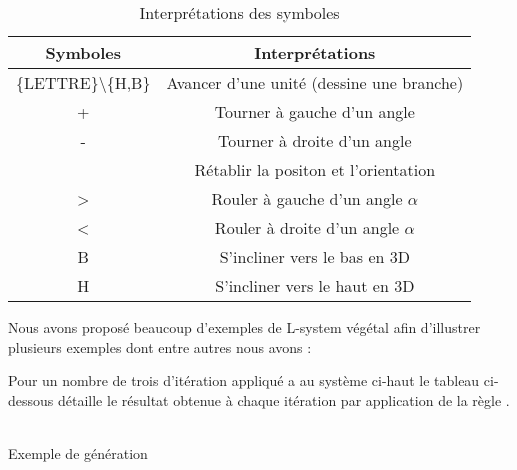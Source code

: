 \begin{table}[h]
      \centering
      \begin{tabular}{|c|c|}
           \hline \textbf{Symboles} & \textbf{Interprétations} \\ \hline
           \{LETTRE\}\textbackslash \{H,B\} & Avancer d’une unité (dessine une branche) \\ \hline
            + & Tourner à gauche d’un angle \\ \hline
            - & Tourner à droite d’un angle \\ \hline
            [ & Enregistrer la position et l’orientation \\ \hline
            ] & Rétablir la positon et l’orientation  \\  \hline
            > & Rouler à gauche d'un angle $\alpha$  \\  \hline
            < & Rouler à droite d'un angle  $\alpha$ \\  \hline
            B & S'incliner vers le bas en 3D \\  \hline
            H & S'incliner vers le haut en 3D \\  \hline
            \hline
      \end{tabular}
      \caption{Interprétations des symboles}
      \label{tab:my_label}
  \end{table}
\newpage
Nous avons proposé beaucoup d’exemples de L-system végétal
afin d’illustrer plusieurs exemples dont entre autres nous avons :
  
  \begin{table}[h]
   Pour un nombre de trois d'itération appliqué a au système ci-haut le tableau ci-dessous détaille 
le résultat obtenue  à chaque itération par application de la règle .
\\
\\
  		\centering 
  	
	\caption{Exemple de génération}\label{figure}

  \end{table}